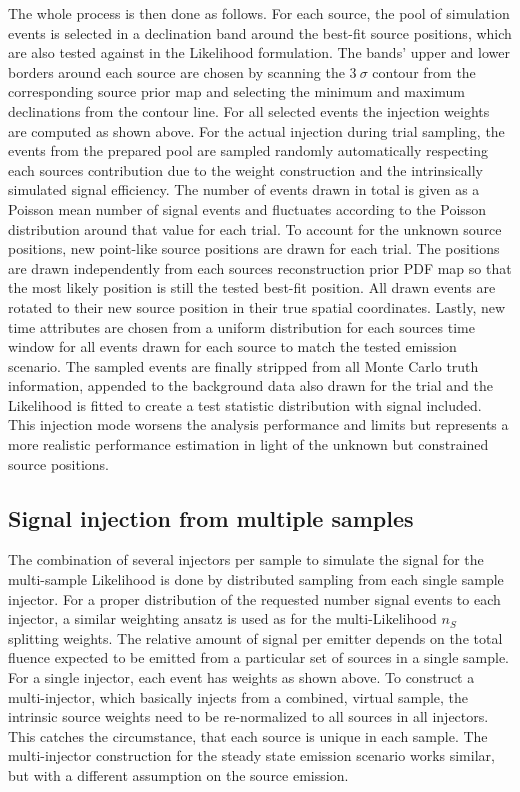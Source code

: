 The whole process is then done as follows.
For each source, the pool of simulation events is selected in a declination band around the best-fit source positions, which are also tested against in the Likelihood formulation.
The bands' upper and lower borders around each source are chosen by scanning the $\SI{3}{\sigma}$ contour from the corresponding source prior map and selecting the minimum and maximum declinations from the contour line.
For all selected events the injection weights are computed as shown above.
For the actual injection during trial sampling, the events from the prepared pool are sampled randomly automatically respecting each sources contribution due to the weight construction and the intrinsically simulated signal efficiency.
The number of events drawn in total is given as a Poisson mean number of signal events and fluctuates according to the Poisson distribution around that value for each trial.
To account for the unknown source positions, new point-like source positions are drawn for each trial.
The positions are drawn independently from each sources reconstruction prior PDF map so that the most likely position is still the tested best-fit position.
All drawn events are rotated to their new source position in their true spatial coordinates.
Lastly, new time attributes are chosen from a uniform distribution for each sources time window for all events drawn for each source to match the tested emission scenario.
The sampled events are finally stripped from all Monte Carlo truth information, appended to the background data also drawn for the trial and the Likelihood is fitted to create a test statistic distribution with signal included.
This injection mode worsens the analysis performance and limits but represents a more realistic performance estimation in light of the unknown but constrained source positions.


\subsection{Signal injection from multiple samples}
The combination of several injectors per sample to simulate the signal for the multi-sample Likelihood is done by distributed sampling from each single sample injector.
For a proper distribution of the requested number signal events to each injector, a similar weighting ansatz is used as for the multi-Likelihood $n_S$ splitting weights.
The relative amount of signal per emitter depends on the total fluence expected to be emitted from a particular set of sources in a single sample.
For a single injector, each event has weights as shown above.
To construct a multi-injector, which basically injects from a combined, virtual sample, the intrinsic source weights need to be re-normalized to all sources in all injectors.
This catches the circumstance, that each source is unique in each sample.
The multi-injector construction for the steady state emission scenario works similar, but with a different assumption on the source emission.


